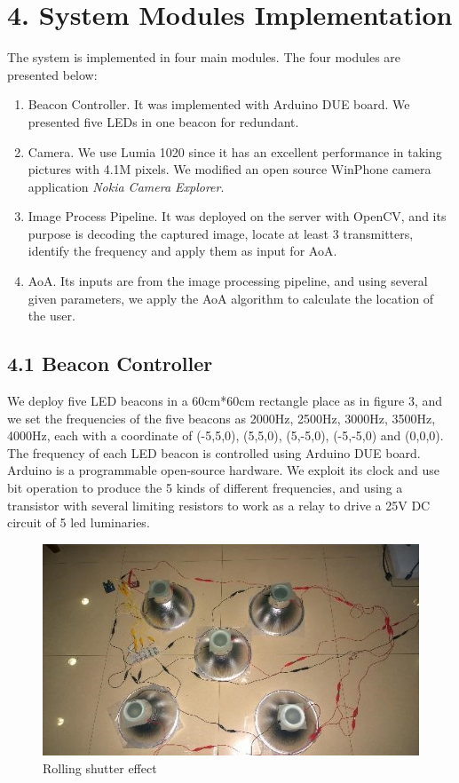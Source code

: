 \documentclass[a4paper, 11pt]{article} %
\begin{document}
\section*{4. System Modules Implementation}
The system is implemented in four main modules. The four modules are presented below:
\begin{enumerate}
	\item Beacon Controller. It was implemented with Arduino DUE board. We presented five LEDs in one beacon for redundant.
	\item Camera. We use Lumia 1020 since it has an excellent performance in taking pictures with 4.1M pixels. We modified an open source WinPhone camera application \textit{Nokia Camera Explorer\cite{NCE}}. 
	\item Image Process Pipeline. It was deployed on the server with OpenCV, and its purpose is decoding the captured image, locate at least 3 transmitters, identify the frequency and apply them as input for AoA.
	\item AoA. Its inputs are from the image processing pipeline, and using several given parameters, we apply the AoA algorithm to calculate the location of the user.
\end{enumerate}

\subsection*{4.1 Beacon Controller}
We deploy five LED beacons in a 60cm*60cm rectangle place as in figure 3, and we set the frequencies of the five beacons as 2000Hz, 2500Hz, 3000Hz, 3500Hz, 4000Hz, each with a coordinate of (-5,5,0), (5,5,0), (5,-5,0), (-5,-5,0) and (0,0,0). 
The frequency of each LED beacon is controlled using Arduino DUE board. Arduino is a programmable open-source hardware. We exploit its clock and use bit operation to produce the 5 kinds of different frequencies, and using a transistor with several limiting resistors to work as a relay to drive a 25V DC circuit of 5 led luminaries.
\begin{figure}[h]
	\centering 
	\includegraphics[width=0.8\linewidth]{Figure3.jpg}
	\caption{Rolling shutter effect}
	\label{fig:subfig}
\end{figure}
\end{document}

